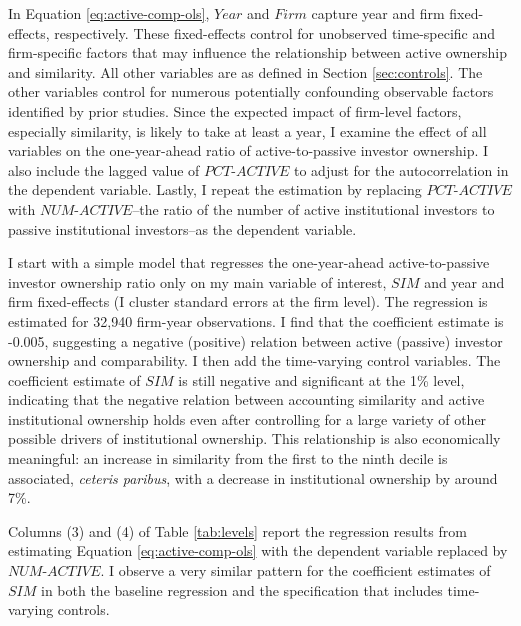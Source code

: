 \documentclass[thesis]{thesis-umich}
\begin{document}
In Equation \ref{eq:active-comp-ols}, $Year$ and $Firm$ capture year and firm fixed-effects, respectively. These fixed-effects control for unobserved time-specific and firm-specific factors that may influence the relationship between active ownership and similarity. All other variables are as defined in Section \ref{sec:controls}. The other variables control for numerous potentially confounding observable factors identified by prior studies. Since the expected impact of firm-level factors, especially similarity, is likely to take at least a year, I examine the effect of all variables on the one-year-ahead ratio of active-to-passive investor ownership. I also include the lagged value of $PCT\text{-}ACTIVE$ to adjust for the autocorrelation in the dependent variable. Lastly, I repeat the estimation by replacing $PCT\text{-}ACTIVE$ with $NUM\text{-}ACTIVE$--the ratio of the number of active institutional investors to passive institutional investors--as the dependent variable. 

I start with a simple model that regresses the one-year-ahead active-to-passive investor ownership ratio only on my main variable of interest, $SIM$ and year and firm fixed-effects (I cluster standard errors at the firm level). The regression is estimated for 32,940 firm-year observations. I find that the coefficient estimate is -0.005, suggesting a negative (positive) relation between active (passive) investor ownership and comparability. I then add the time-varying control variables. The coefficient estimate of $SIM$ is still negative and significant at the 1\% level, indicating that the negative relation between accounting similarity and active institutional ownership holds even after controlling for a large variety of other possible drivers of institutional ownership. This relationship is also economically meaningful: an increase in similarity from the first to the ninth decile is associated, \emph{ceteris paribus}, with a decrease in institutional ownership by around 7\%.


Columns (3) and (4) of Table \ref{tab:levels} report the regression results from estimating Equation \ref{eq:active-comp-ols} with the dependent variable replaced by $NUM\text{-}ACTIVE$. I observe a very similar pattern for the coefficient estimates of $SIM$ in both the baseline regression and the specification that includes time-varying controls.
\end{document}
